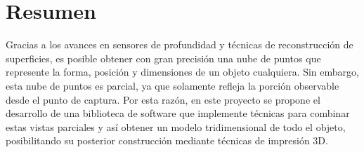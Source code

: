 \chapter{Resumen}
Gracias a los avances en sensores de profundidad y técnicas de reconstrucción de superficies,
es posible obtener con gran precisión una nube de puntos que represente
la forma, posición y dimensiones de un objeto cualquiera.
Sin embargo, esta nube de puntos es parcial, ya que solamente refleja
la porción observable desde el punto de captura.
Por esta razón, en este proyecto se propone el desarrollo de una biblioteca de software
que implemente técnicas para combinar estas vistas parciales
y así obtener un modelo tridimensional de todo el objeto,
posibilitando su posterior construcción mediante técnicas de impresión 3D.
